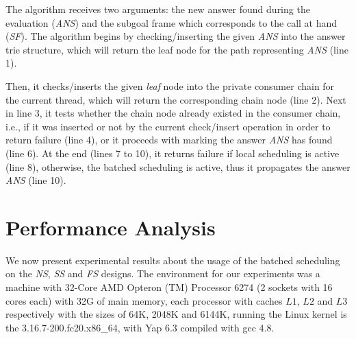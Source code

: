 \documentclass{llncs}
\begin{document}
The algorithm receives two arguments: the new answer found during the
evaluation (\emph{ANS}) and the subgoal frame which corresponds to the
call at hand (\emph{SF}). The algorithm begins by checking/inserting
the given \emph{ANS} into the answer trie structure, which will return
the leaf node for the path representing \emph{ANS} (line 1).

Then, it checks/inserts the given \emph{leaf} node into the private
consumer chain for the current thread, which will return the
corresponding chain node (line 2). Next in line 3, it tests whether
the chain node already existed in the consumer chain, i.e., if it was
inserted or not by the current check/insert operation in order to
return failure (line 4), or it proceeds with marking the answer
\emph{ANS} has found (line 6). At the end (lines 7 to 10), it returns
failure if local scheduling is active (line 8), otherwise, the batched
scheduling is active, thus it propagates the answer \emph{ANS} (line
10).

\section{Performance Analysis}

We now present experimental results about the usage of the batched
scheduling on the \emph{NS}, \emph{SS} and \emph{FS} designs. The
environment for our experiments was a machine with 32-Core AMD Opteron
(TM) Processor 6274 (2 sockets with 16 cores each) with 32G of main
memory, each processor with caches $L1$, $L2$ and $L3$ respectively
with the sizes of 64K, 2048K and 6144K, running the Linux kernel is
the 3.16.7-200.fc20.x86\_64, with Yap 6.3 compiled with gcc 4.8.

\end{document}
